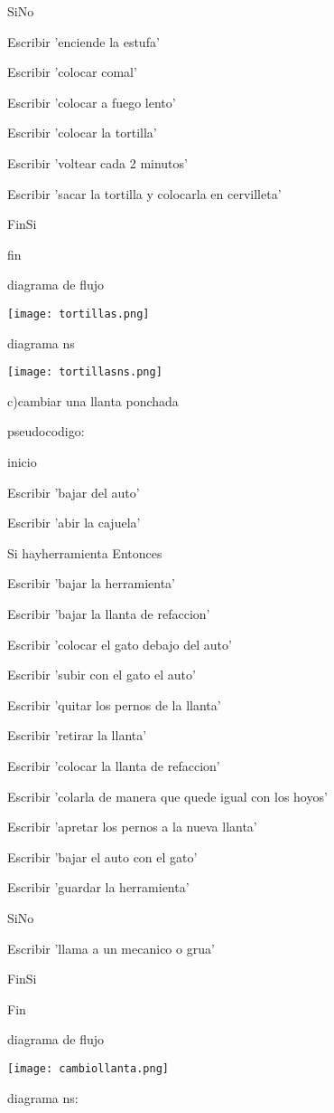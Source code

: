 \documentclass[10pt,a4paper]{article}
\begin{document}
\begin{multicols}{2}
	SiNo

		Escribir 'enciende la estufa'

		Escribir 'colocar comal'

		Escribir 'colocar a fuego lento'

		Escribir 'colocar la tortilla'

		Escribir 'voltear cada 2 minutos'
		
		Escribir 'sacar la tortilla y colocarla en cervilleta'
	
	FinSi
	
fin 

diagrama de flujo

\texttt{[image: tortillas.png]} 
	
diagrama ns 

\texttt{[image: tortillasns.png]} 

c)cambiar una llanta ponchada

pseudocodigo: 

inicio

Escribir 'bajar del auto'

	Escribir 'abir la cajuela'

	Si hayherramienta Entonces

		Escribir 'bajar la herramienta'

		Escribir 'bajar la llanta de refaccion'

		Escribir 'colocar el gato debajo del auto'

		Escribir 'subir con el gato el auto'

		Escribir 'quitar los pernos de la llanta'

		Escribir 'retirar la llanta'

		Escribir 'colocar la llanta de refaccion'

		Escribir 'colarla de manera que quede igual con los hoyos'

		Escribir 'apretar los pernos a la nueva llanta'

		Escribir 'bajar el auto con el gato'

		Escribir 'guardar la herramienta'

	SiNo

		Escribir 'llama a un mecanico o grua'

	FinSi

Fin

	diagrama de flujo 

\texttt{[image: cambiollanta.png]} 	

diagrama ns:
 

\end{multicols}
\end{document}
